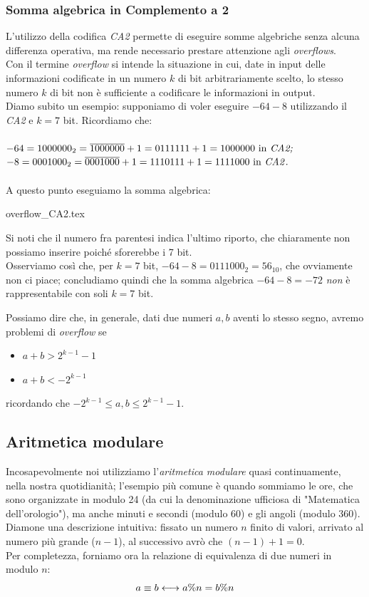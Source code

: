 \documentclass[class=book, crop=false]{standalone}
\begin{document}
\subsubsection{Somma algebrica in Complemento a 2} L'utilizzo della codifica \emph{CA2} permette di eseguire somme algebriche senza alcuna differenza operativa, ma rende necessario prestare attenzione agli \emph{overflows}.\\
Con il termine \emph{overflow} si intende la situazione in cui, date in input delle informazioni codificate in un numero $k$ di bit arbitrariamente scelto, lo stesso numero $k$ di bit non è sufficiente a codificare le informazioni in output. \\
Diamo subito un esempio: supponiamo di voler eseguire $-64-8$ utilizzando il \emph{CA2} e $k=7$ bit. Ricordiamo che:\\\\
$-64=1000000_{2}=\overline{1000000}+1=0111111+1=1000000 \text{ in \emph{CA2;}}$\\
$-8=0001000_{2}=\overline{0001000}+1=1110111+1=1111000 \text{ in \emph{CA2}}.$\\\\
A questo punto eseguiamo la somma algebrica:
\begin{table}[H]
	\centering
	{overflow_CA2.tex}
\end{table}
Si noti che il numero fra parentesi indica l'ultimo riporto, che chiaramente non possiamo inserire poiché sforerebbe i 7 bit.\\
Osserviamo così che, per $k=7$ bit, $-64-8=0111000_{2}=56_{10}$, che ovviamente non ci piace; concludiamo quindi che la somma algebrica $-64-8=-72$ \emph{non} è rappresentabile con soli $k=7$ bit.

Possiamo dire che, in generale, dati due numeri $a, b$ aventi lo stesso segno, avremo problemi di \emph{overflow} se
\begin{itemize}[noitemsep,nolistsep]
	\item $a+b>2^{k-1}-1$
	\item $a+b<-2^{k-1}$
\end{itemize}
ricordando che $-2^{k-1}\le a,b\le 2^{k-1}-1$.

\subsection{Aritmetica modulare} Incosapevolmente noi utilizziamo l'\emph{aritmetica modulare} quasi continuamente, nella nostra quotidianità; l'esempio più comune è quando sommiamo le ore, che sono organizzate in modulo 24 (da cui la denominazione ufficiosa di "Matematica dell'orologio"), ma anche minuti e secondi (modulo 60) e gli angoli (modulo 360).\\
Diamone una descrizione intuitiva: fissato un numero $n$ finito di valori, arrivato al numero più grande ($n-1$), al successivo avrò che $(n-1)+1=0$.\\
Per completezza, forniamo ora la relazione di equivalenza di due numeri in modulo $n$:\\
\begin{equation*}
\centering
a\equiv b \longleftrightarrow a\%n=b\%n
\end{equation*}
\end{document}
